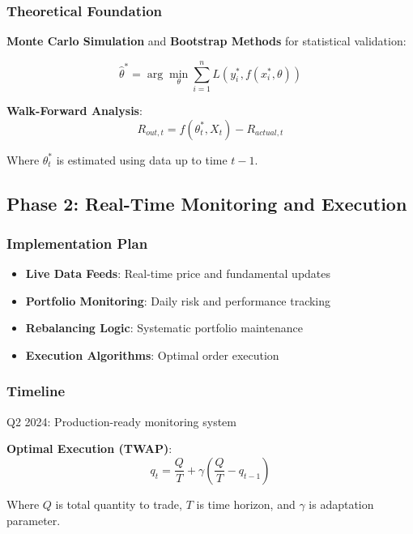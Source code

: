 \documentclass[12pt,a4paper]{article}
\begin{document}
\subsubsection{Theoretical Foundation}
\textbf{Monte Carlo Simulation} and \textbf{Bootstrap Methods} for statistical validation:

\begin{equation}
\hat{\theta}^* = \arg\min_\theta \sum_{i=1}^n L(y_i^*, f(x_i^*, \theta))
\end{equation}

\textbf{Walk-Forward Analysis}:
\begin{equation}
R_{out,t} = f(\theta_t^*, X_{t}) - R_{actual,t}
\end{equation}

Where $\theta_t^*$ is estimated using data up to time $t-1$.

\subsection{Phase 2: Real-Time Monitoring and Execution}

\subsubsection{Implementation Plan}
\begin{itemize}
    \item \textbf{Live Data Feeds}: Real-time price and fundamental updates
    \item \textbf{Portfolio Monitoring}: Daily risk and performance tracking
    \item \textbf{Rebalancing Logic}: Systematic portfolio maintenance
    \item \textbf{Execution Algorithms}: Optimal order execution
\end{itemize}

\subsubsection{Timeline}
Q2 2024: Production-ready monitoring system

\textbf{Optimal Execution (TWAP)}:
\begin{equation}
q_t = \frac{Q}{T} + \gamma \left(\frac{Q}{T} - q_{t-1}\right)
\end{equation}

Where $Q$ is total quantity to trade, $T$ is time horizon, and $\gamma$ is adaptation parameter.
\end{document}
